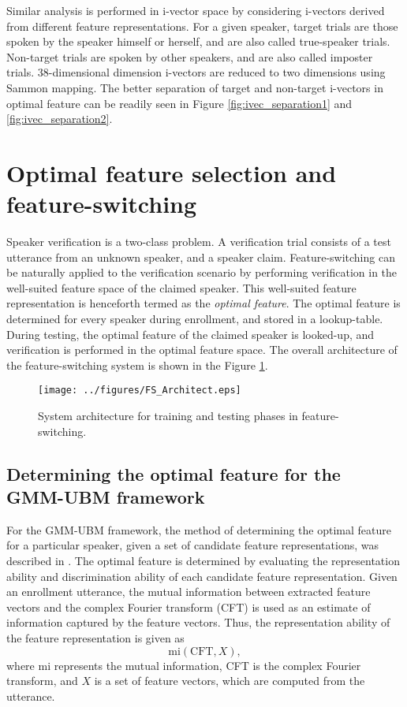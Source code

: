\documentclass[preprint,12pt,5p]{elsarticle}
\begin{document}
Similar analysis is performed in i-vector space by considering i-vectors derived
from different feature representations.  For a given speaker, target trials are
those spoken by the speaker himself or herself, and are also called true-speaker
trials. Non-target trials are spoken by other speakers, and are also called
imposter trials. 38-dimensional dimension i-vectors are reduced
to two dimensions using Sammon mapping. The better separation of target and
non-target i-vectors in optimal feature  can be readily seen in Figure
\ref{fig:ivec_separation1} and \ref{fig:ivec_separation2}.  

\section{Optimal feature selection and feature-switching}
\label{sec:optFeat}
Speaker verification is a two-class problem. A verification trial consists of a
test utterance from an unknown speaker, and a speaker claim. Feature-switching
can be naturally applied to the verification scenario by performing
verification in the well-suited feature space of the claimed speaker. This
well-suited feature representation is henceforth termed as the \emph{optimal
feature}. The optimal feature is determined for every speaker
during enrollment, and stored in a lookup-table. During testing, the optimal
feature of the claimed speaker is looked-up, and verification is performed in
the optimal feature space. The overall architecture of the feature-switching system 
is shown in the Figure \ref{fig:systemArch}. 

\begin{figure}[th]
\centering
\texttt{[image: ../figures/FS\_Architect.eps]}
\caption{System architecture for training and testing phases in feature-switching.}
\label{fig:systemArch}
\end{figure}

\subsection{Determining the optimal feature for the GMM-UBM framework}
\label{subsec:ubm_optFeat}

For the GMM-UBM framework, the method of determining the optimal feature for a
particular speaker, given a set of candidate feature representations, was
described in \cite{padmanInterspeech2010}. The optimal feature is determined by
evaluating the representation ability and discrimination ability
of each candidate feature representation. Given an enrollment utterance, the
mutual information between extracted feature vectors and the complex Fourier
transform (CFT) is used as an estimate of information captured by the feature
vectors. Thus, the representation ability of the feature representation is given
as 
\begin{equation}
\textrm{mi}(\textrm{CFT},X),
\end{equation}
where $\textrm{mi}$ represents the mutual information, CFT is the complex
Fourier transform, and $X$ is a set of feature vectors, which are computed from
the utterance.
\end{document}
